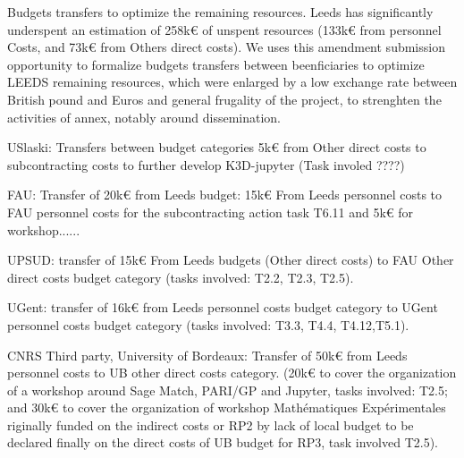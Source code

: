 
\item Budgets transfers to optimize the remaining resources.
Leeds has significantly underspent  an estimation of 258k€ of unspent resources (133k€ from personnel Costs, and 73k€ from Others direct costs). We uses this amendment submission opportunity to formalize budgets transfers between beenficiaries to optimize LEEDS remaining resources, which were enlarged by a low exchange rate between British pound and Euros and general frugality of the project, to strenghten the activities of annex, notably around dissemination. 

\item USlaski: Transfers between budget categories 5k€ from Other direct costs to subcontracting costs to further develop K3D-jupyter (Task involed ????)
\item FAU: Transfer of 20k€ from Leeds budget: 15k€ From Leeds personnel costs to FAU personnel costs for the subcontracting action task T6.11 and 5k€ for workshop......
\item UPSUD: transfer of 15k€ From Leeds budgets (Other direct costs) to FAU Other direct costs budget category (tasks involved: T2.2, T2.3, T2.5).
\item UGent: transfer of 16k€ from Leeds personnel costs budget category to UGent personnel costs budget category (tasks involved: T3.3, T4.4, T4.12,T5.1).
\item CNRS Third party, University of Bordeaux: Transfer of 50k€ from Leeds personnel costs to UB other direct costs category. (20k€ to cover the organization of a workshop around Sage Match, PARI/GP and Jupyter, tasks involved: T2.5; and 30k€ to cover the organization of workshop Mathématiques Expérimentales riginally funded on the indirect costs or RP2 by lack of local budget to be declared finally on the direct costs of UB budget for RP3, task involved T2.5).
